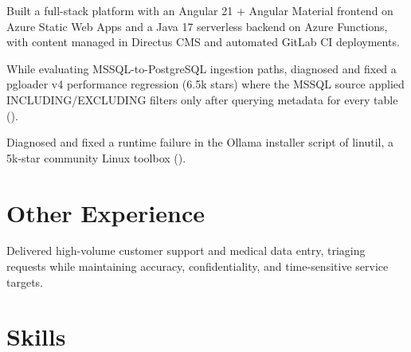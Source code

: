 \documentclass[letterpaper,10pt]{article}
\begin{document}
\begin{resume_list}
\item Built a full-stack platform with an Angular 21 + Angular Material frontend on Azure Static Web Apps and a Java 17 serverless backend on Azure Functions, with content managed in Directus CMS and automated GitLab CI deployments.
\end{resume_list}

\begin{resume_list}
\item While evaluating MSSQL-to-PostgreSQL ingestion paths, diagnosed and fixed a pgloader v4 performance regression (6.5k stars) where the MSSQL source applied INCLUDING/EXCLUDING filters only after querying metadata for every table ().
\item Diagnosed and fixed a runtime failure in the Ollama installer script of linutil, a 5k-star community Linux toolbox ().
\end{resume_list}

\section{Other Experience}

\begin{resume_list}
\item Delivered high-volume customer support and medical data entry, triaging requests while maintaining accuracy, confidentiality, and time-sensitive service targets.
\end{resume_list}

\section{Skills}

\begin{skill_list}
\end{skill_list}
\end{document}
